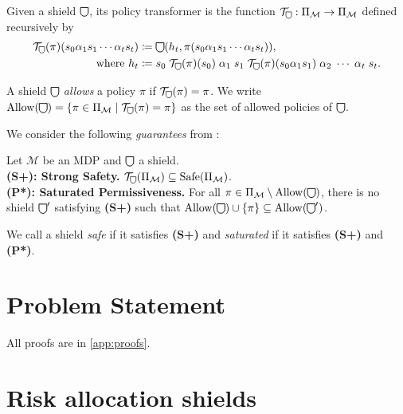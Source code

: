 \documentclass[runningheads]{llncs}
\newcommand{\M}{\mathcal{M}}
\newcommand{\Distr}{\Delta}
\newcommand{\Hist}{\mathrm{Hist}}
\newcommand{\Allow}{\mathrm{Allow}}
\newcommand\shieldbase{%
  \tikz[baseline=0.2ex] \draw[semithick]
    (0,1.75ex) -- (0,0.75ex)
    arc [radius=0.75ex, start angle=-180, end angle=0]
    -- (1.5ex,1.75ex) -- cycle;%
}
\DeclareRobustCommand\shield{%
  \mathord{\scalerel*{\shieldbase}{\bigcirc}}%
}
\newcommand{\last}{\mathit{last}}
\newcommand{\T}{\mathcal{T}}
\newcommand{\Safe}{\mathrm{Safe}}
\newcommand{\SafetyStrong}{\textbf{(S+)}\xspace}
\newcommand{\SaturatedPermisiveness}{\textbf{(P*)}\xspace}
\begin{document}
\begin{definition}
    \label{def:policytransformer}
    Given a shield \(\shield\), its policy transformer is the function \(\T_{\shield} : \Pi_{\M} \rightarrow \Pi_{\M}\) defined recursively by
    \begin{align*}
        \T_{\shield}(\pi)(s_0 \alpha_1 s_1 \cdots \alpha_t s_t) \coloneq\;& \shield(h_t, \pi(s_0 \alpha_1 s_1 \cdots \alpha_t s_t)),\\
        \text{where } h_t \coloneq\;& s_0 \; \T_{\shield}(\pi)(s_0) \; \alpha_1 \; s_1 \; \T_{\shield}(\pi)(s_0\alpha_1s_1) \; \alpha_2 \; \cdots \; \alpha_t \; s_t.
    \end{align*}
\end{definition}
A shield \(\shield\) \emph{allows} a policy \(\pi\) if \(\T_{\shield}(\pi) = \pi\). We write \(\Allow(\shield) = \{\pi \in \Pi_\M \mid \T_{\shield}(\pi) = \pi\}\) as the set of allowed policies of \(\shield\).


We consider the following \emph{guarantees} from \cite{DBLP:conf/cav/HeckMACJ26}:

\begin{mdframed}[style=MyFrame,nobreak=true]
Let $\M$ be an MDP and $\shield$ a shield.\\
\textbf{(S+): Strong Safety.} \(\T_{\shield}(\Pi_\M) \subseteq \Safe(\Pi_\M)\). \\
\textbf{(P*): Saturated Permissiveness.} For all \(\pi \in \Pi_\M \setminus \Allow(\shield)\), there is no shield \(\shield'\) satisfying \SafetyStrong such that \(\Allow(\shield) \cup \{\pi\} \subseteq \Allow(\shield')\).
\end{mdframed}
We call a shield \emph{safe} if it satisfies \SafetyStrong and \emph{saturated} if it satisfies \SafetyStrong and \SaturatedPermisiveness.

\section{Problem Statement}


All proofs are in \cref{app:proofs}.

\section{Risk allocation shields}
\end{document}
